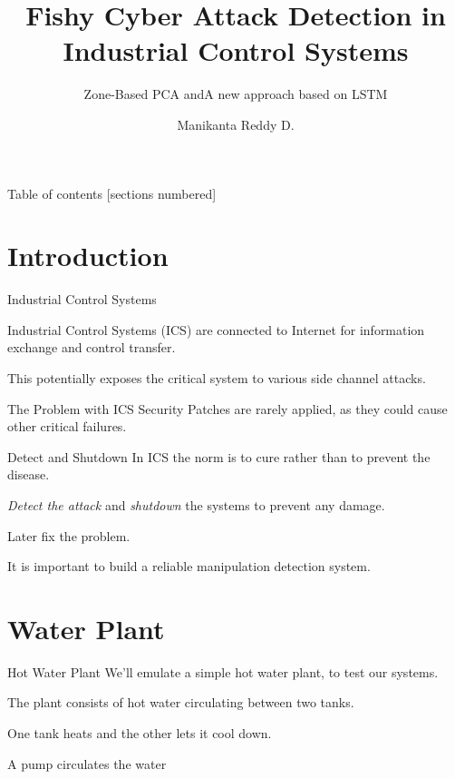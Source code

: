 \documentclass[10pt]{beamer}
\title{Fishy Cyber Attack Detection in \newline Industrial Control Systems}
\subtitle{Zone-Based PCA and\newline A new approach based on LSTM}
\date{}
\author{Manikanta Reddy D.}
\institute{IIT Kanpur}
\begin{document}
\maketitle

\begin{frame}{Table of contents}
  [sections numbered]
  \tableofcontents[hideallsubsections]
\end{frame}

\section{Introduction}

\begin{frame}[fragile]{Industrial Control Systems}
	
    Industrial Control Systems (ICS) are connected to Internet for information exchange and control transfer.
    
    This potentially exposes the critical system to various side channel attacks.
  
\end{frame}
\begin{frame}[fragile]{The Problem with ICS}
	Security Patches are rarely applied, as they could cause other critical failures.
    
    \begin{alertblock}{Detect and Shutdown}
    	In ICS the norm is to cure rather than to prevent the disease.
        
        \emph{Detect the attack} and \emph{shutdown} the systems to             prevent any damage.
        
        Later fix the problem.
        
        It is important to build a reliable manipulation detection 		         system.
    \end{alertblock}
\end{frame}

\section{Water Plant}

\begin{frame}{Hot Water Plant}
	We'll emulate a simple hot water plant, to test our systems.
    
    The plant consists of hot water circulating between two tanks.
    
    One tank heats and the other lets it cool down.
    
    A pump circulates the water
\end{frame}
\end{document}
